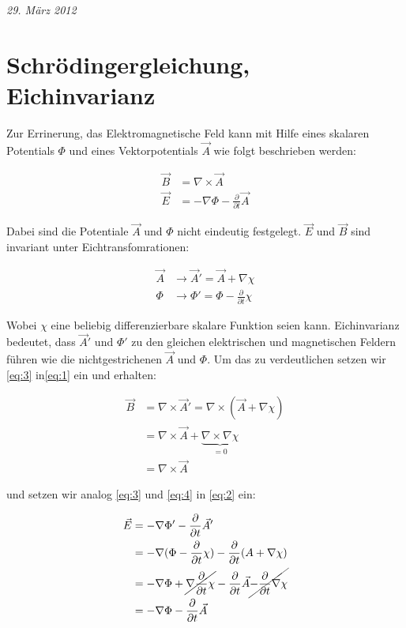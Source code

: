 



\textit{29. März 2012}


\section*{Schrödingergleichung, Eichinvarianz}

Zur Errinerung, das Elektromagnetische Feld kann mit Hilfe eines skalaren Potentials \(\Phi\) und eines Vektorpotentials \(\vec A\) wie folgt beschrieben werden:

\begin{align}
  \vec B &= \nabla \times \vec A   \label{eq:1}\\
 \vec E &= -\nabla\Phi - \frac{\partial }{\partial t}\vec A  \label{eq:2}
\end{align}

Dabei sind die Potentiale \(\vec A\) und \(\Phi\) nicht eindeutig festgelegt. \(\vec E\) und \(\vec B\) sind invariant unter Eichtransfomrationen:

\begin{align}
  \vec A &\rightarrow \vec A' = \vec A+\nabla\chi  \label{eq:3}\\
 \Phi &\rightarrow \Phi' = \Phi - \frac{\partial}{\partial t} \chi \label{eq:4}
\end{align}

Wobei \(\chi\) eine beliebig differenzierbare skalare Funktion seien kann. Eichinvarianz bedeutet, dass \(\vec A'\) und \(\Phi'\) zu den gleichen elektrischen und magnetischen Feldern führen wie die nichtgestrichenen \(\vec A\) und \(\Phi\). Um das zu verdeutlichen setzen wir \eqref{eq:3} in\eqref{eq:1} ein und erhalten:

\begin{align}
  \vec B &= \nabla \times \vec A' = \nabla \times (\vec A+\nabla\chi   )\\
&= \nabla \times \vec A + \underbrace{ \nabla \times \nabla \chi }_{=0}\\
&= \nabla \times \vec A \label{eq:5}
\end{align}

und setzen wir analog \eqref{eq:3} und \eqref{eq:4} in \eqref{eq:2} ein:

\begin{align}
 \vec E &= -\nabla\Phi' - \frac{\partial }{\partial t}\vec A' \\
 &= -\nabla(\Phi - \frac{\partial}{\partial t} \chi ) - \frac{\partial }{\partial t}(  A+\nabla\chi )\\
&= -\nabla\Phi + \cancel{\nabla\frac{\partial}{\partial t} \chi}  - \frac{\partial }{\partial t}  \vec A \cancel{ - \frac{\partial }{\partial t}\nabla\chi}\\
&= -\nabla\Phi - \frac{\partial }{\partial t}  \vec A \label{eq:6}
\end{align}

